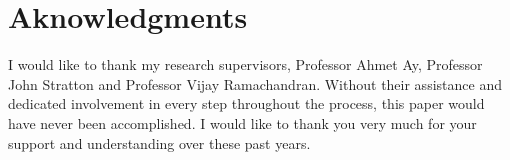 \documentclass[../thesis.tex]{subfiles}
\begin{document}
\chapter*{Aknowledgments}
I would like to thank my research supervisors, Professor Ahmet Ay, Professor John Stratton and Professor Vijay Ramachandran. Without their assistance and dedicated involvement in every step throughout the process, this paper would have never been accomplished. I would like to thank you very much for your support and understanding over these past years.
\cleardoublepage
\end{document}
